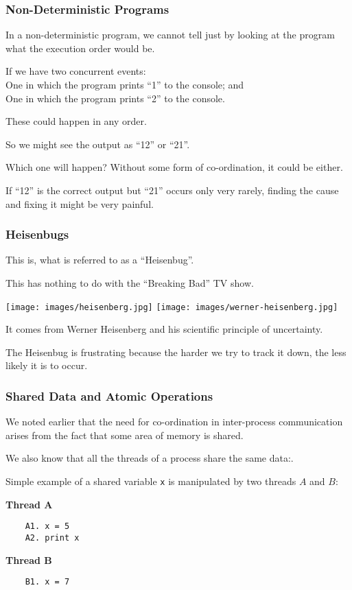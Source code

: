 \begin{frame}
	\frametitle{Non-Deterministic Programs}

	In a non-deterministic program, we cannot tell just by looking at the program what the execution order would be.

	If we have two concurrent events: \\
	\quad One in which the program prints ``1'' to the console; and\\
	\quad One in which the program prints ``2'' to the console.

	These could happen in any order.

	So we might see the output as ``12'' or ``21''.

	Which one will happen? Without some form of co-ordination, it could be either.

	If ``12'' is the correct output but ``21'' occurs only very rarely, finding the cause and fixing it might be very painful.


\end{frame}


\begin{frame}
	\frametitle{Heisenbugs}

	This is, what is referred to as a ``Heisenbug''.

	This has nothing to do with the ``Breaking Bad'' TV show.

	\begin{center}
		\texttt{[image: images/heisenberg.jpg]}
		\texttt{[image: images/werner-heisenberg.jpg]}
	\end{center}

	It comes from Werner Heisenberg and his scientific principle of uncertainty.

	The Heisenbug is frustrating because the harder we try to track it down, the less likely it is to occur.


\end{frame}


\begin{frame}[fragile]
	\frametitle{Shared Data and Atomic Operations}
	We noted earlier that the need for co-ordination in inter-process communication arises from the fact that some area of memory is shared.

	We also know that all the threads of a process share the same data:.

	Simple example of a shared variable \texttt{x} is manipulated by two threads $A$ and $B$:

	\begin{multicols}{2}
		\textbf{Thread A}
		\begin{verbatim}
	A1. x = 5
	A2. print x
	\end{verbatim}
		\columnbreak
		\textbf{Thread B}
		\begin{verbatim}
	B1. x = 7
	
	\end{verbatim}
	\end{multicols}

\end{frame}

